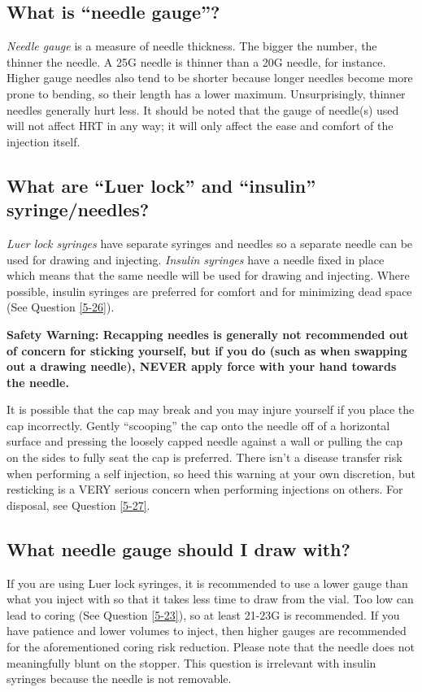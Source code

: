 \documentclass{article}
\begin{document}
\subsection{What is “needle gauge”?}

\textit{Needle gauge }is a measure of needle thickness. The bigger the number, the thinner the needle. A 25G needle is thinner than a 20G needle, for instance. Higher gauge needles also tend to be shorter because longer needles become more prone to bending, so their length has a lower maximum. Unsurprisingly, thinner needles generally hurt less. It should be noted that the gauge of needle(s) used will not affect HRT in any way; it will only affect the ease and comfort of the injection itself.

\subsection{What are “Luer lock” and “insulin” syringe/needles?}\label{5-13}

\textit{Luer lock syringes} have separate syringes and needles so a separate needle can be used for drawing and injecting. \textit{Insulin syringes} have a needle fixed in place which means that the same needle will be used for drawing and injecting. Where possible, insulin syringes are preferred for comfort and for minimizing dead space (See Question \ref{5-26}).

\textbf{Safety Warning: Recapping needles is generally not recommended out of concern for sticking yourself, but if you do (such as when swapping out a drawing needle), NEVER apply force with your hand towards the needle.}

It is possible that the cap may break and you may injure yourself if you place the cap incorrectly. Gently “scooping” the cap onto the needle off of a horizontal surface and pressing the loosely capped needle against a wall or pulling the cap on the sides to fully seat the cap is preferred. There isn't a disease transfer risk when performing a self injection, so heed this warning at your own discretion, but resticking is a VERY serious concern when performing injections on others. For disposal, see Question \ref{5-27}.

\subsection{What needle gauge should I draw with?}

If you are using Luer lock syringes, it is recommended to use a lower gauge than what you inject with so that it takes less time to draw from the vial. Too low can lead to coring (See Question \ref{5-23}), so at least 21-23G is recommended. If you have patience and lower volumes to inject, then higher gauges are recommended for the aforementioned coring risk reduction. Please note that the needle does not meaningfully blunt on the stopper. This question is irrelevant with insulin syringes because the needle is not removable.
\end{document}
